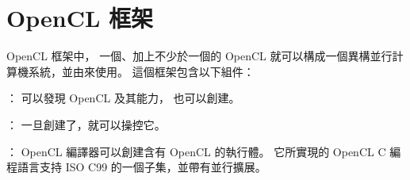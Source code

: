\section{OpenCL 框架}
OpenCL 框架中，
一個、加上不少於一個的 OpenCL 
就可以構成一個異構並行計算機系統，並由來使用。
這個框架包含以下組件：
\startigBase
\item {}：
可以發現 OpenCL 及其能力，
也可以創建。

\item {}：
一旦創建了，就可以操控它。

\item {}：
OpenCL 編譯器可以創建含有 OpenCL 的執行體。
它所實現的 OpenCL C 編程語言支持 ISO C99 的一個子集，並帶有並行擴展。
\stopigBase

